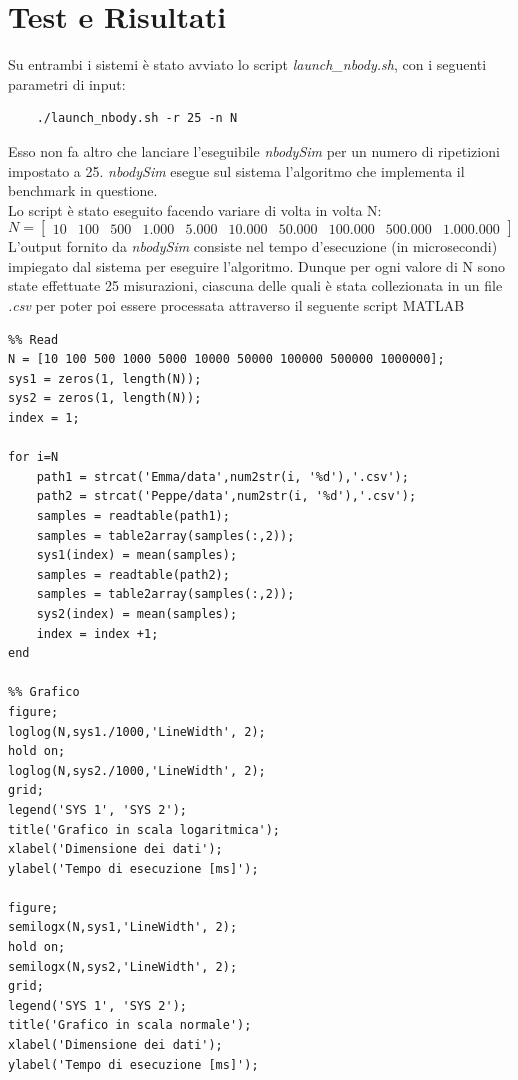 \section{Test e Risultati}
Su entrambi i sistemi è stato avviato lo script \textit{launch\_nbody.sh}, con i seguenti parametri di input:
\begin{verbatim}
	./launch_nbody.sh -r 25 -n N
\end{verbatim}
Esso non fa altro che lanciare l'eseguibile \textit{nbodySim} per un numero di ripetizioni impostato a 25. 
\textit{nbodySim} esegue sul sistema l'algoritmo che implementa il benchmark in questione.
\\
Lo script è stato eseguito facendo variare di volta in volta N:
\begin{equation*}
	N = \begin{bmatrix}
		10 & 100 & 500 & 1.000 & 5.000 & 10.000 & 50.000 & 100.000 & 500.000 & 1.000.000
	\end{bmatrix}
\end{equation*}
L'output fornito da \textit{nbodySim} consiste nel tempo d'esecuzione (in microsecondi) impiegato dal sistema per eseguire l'algoritmo. 
Dunque per ogni valore di N sono state effettuate 25 misurazioni, ciascuna delle quali è stata collezionata in un file \textit{.csv} per poter poi essere processata attraverso il seguente script MATLAB
\begin{verbatim}
%% Read 
N = [10 100 500 1000 5000 10000 50000 100000 500000 1000000];
sys1 = zeros(1, length(N));
sys2 = zeros(1, length(N));
index = 1;

for i=N
	path1 = strcat('Emma/data',num2str(i, '%d'),'.csv');
	path2 = strcat('Peppe/data',num2str(i, '%d'),'.csv');
	samples = readtable(path1);
	samples = table2array(samples(:,2));
	sys1(index) = mean(samples);
	samples = readtable(path2);
	samples = table2array(samples(:,2));
	sys2(index) = mean(samples);
	index = index +1;
end

%% Grafico
figure;
loglog(N,sys1./1000,'LineWidth', 2);
hold on;
loglog(N,sys2./1000,'LineWidth', 2);
grid;
legend('SYS 1', 'SYS 2');
title('Grafico in scala logaritmica');
xlabel('Dimensione dei dati');
ylabel('Tempo di esecuzione [ms]');

figure;
semilogx(N,sys1,'LineWidth', 2);
hold on;
semilogx(N,sys2,'LineWidth', 2);
grid;
legend('SYS 1', 'SYS 2');
title('Grafico in scala normale');
xlabel('Dimensione dei dati');
ylabel('Tempo di esecuzione [ms]');
\end{verbatim}
